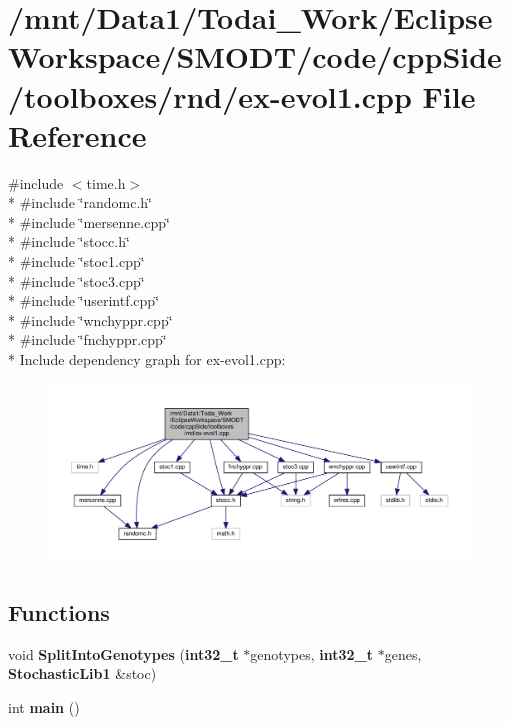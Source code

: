 \section{/mnt/\-Data1/\-Todai\-\_\-\-Work/\-Eclipse\-Workspace/\-S\-M\-O\-D\-T/code/cpp\-Side/toolboxes/rnd/ex-\/evol1.cpp File Reference}
\label{toolboxes_2rnd_2ex-evol1_8cpp}
{\ttfamily \#include $<$time.\-h$>$}\\*
{\ttfamily \#include \char`\"{}randomc.\-h\char`\"{}}\\*
{\ttfamily \#include \char`\"{}mersenne.\-cpp\char`\"{}}\\*
{\ttfamily \#include \char`\"{}stocc.\-h\char`\"{}}\\*
{\ttfamily \#include \char`\"{}stoc1.\-cpp\char`\"{}}\\*
{\ttfamily \#include \char`\"{}stoc3.\-cpp\char`\"{}}\\*
{\ttfamily \#include \char`\"{}userintf.\-cpp\char`\"{}}\\*
{\ttfamily \#include \char`\"{}wnchyppr.\-cpp\char`\"{}}\\*
{\ttfamily \#include \char`\"{}fnchyppr.\-cpp\char`\"{}}\\*
Include dependency graph for ex-\/evol1.cpp\-:
\nopagebreak
\begin{figure}[H]
\begin{center}
\leavevmode
\includegraphics[width=350pt]{toolboxes_2rnd_2ex-evol1_8cpp__incl}
\end{center}
\end{figure}
\subsection*{Functions}
\begin{DoxyCompactItemize}
\item 
void {\bf Split\-Into\-Genotypes} ({\bf int32\-\_\-t} $\ast$genotypes, {\bf int32\-\_\-t} $\ast$genes, {\bf Stochastic\-Lib1} \&stoc)
\item 
int {\bf main} ()
\end{DoxyCompactItemize}


